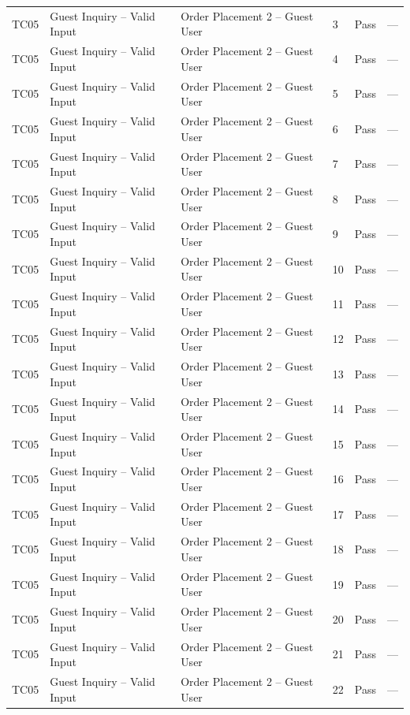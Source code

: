{\begin{longtable}{@{}p{1.2cm} p{4.2cm} p{4.4cm} p{0.8cm} p{0.9cm} p{1.6cm}@{}}
  TC05 & Guest Inquiry -- Valid Input & Order Placement 2 -- Guest User & 3 & Pass & --- \\
  TC05 & Guest Inquiry -- Valid Input & Order Placement 2 -- Guest User & 4 & Pass & --- \\
  TC05 & Guest Inquiry -- Valid Input & Order Placement 2 -- Guest User & 5 & Pass & --- \\
  TC05 & Guest Inquiry -- Valid Input & Order Placement 2 -- Guest User & 6 & Pass & --- \\
  TC05 & Guest Inquiry -- Valid Input & Order Placement 2 -- Guest User & 7 & Pass & --- \\
  TC05 & Guest Inquiry -- Valid Input & Order Placement 2 -- Guest User & 8 & Pass & --- \\
  TC05 & Guest Inquiry -- Valid Input & Order Placement 2 -- Guest User & 9 & Pass & --- \\
  TC05 & Guest Inquiry -- Valid Input & Order Placement 2 -- Guest User & 10 & Pass & --- \\
  TC05 & Guest Inquiry -- Valid Input & Order Placement 2 -- Guest User & 11 & Pass & --- \\
  TC05 & Guest Inquiry -- Valid Input & Order Placement 2 -- Guest User & 12 & Pass & --- \\
  TC05 & Guest Inquiry -- Valid Input & Order Placement 2 -- Guest User & 13 & Pass & --- \\
  TC05 & Guest Inquiry -- Valid Input & Order Placement 2 -- Guest User & 14 & Pass & --- \\
  TC05 & Guest Inquiry -- Valid Input & Order Placement 2 -- Guest User & 15 & Pass & --- \\
  TC05 & Guest Inquiry -- Valid Input & Order Placement 2 -- Guest User & 16 & Pass & --- \\
  TC05 & Guest Inquiry -- Valid Input & Order Placement 2 -- Guest User & 17 & Pass & --- \\
  TC05 & Guest Inquiry -- Valid Input & Order Placement 2 -- Guest User & 18 & Pass & --- \\
  TC05 & Guest Inquiry -- Valid Input & Order Placement 2 -- Guest User & 19 & Pass & --- \\
  TC05 & Guest Inquiry -- Valid Input & Order Placement 2 -- Guest User & 20 & Pass & --- \\
  TC05 & Guest Inquiry -- Valid Input & Order Placement 2 -- Guest User & 21 & Pass & --- \\
  TC05 & Guest Inquiry -- Valid Input & Order Placement 2 -- Guest User & 22 & Pass & --- \\

\end{longtable}}
